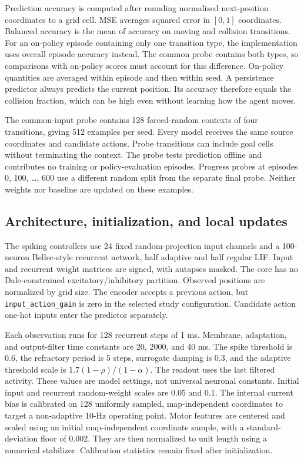 Prediction accuracy is computed after rounding normalized next-position coordinates to a grid cell. MSE averages squared error in $[0,1]$ coordinates. Balanced accuracy is the mean of accuracy on moving and collision transitions. For an on-policy episode containing only one transition type, the implementation uses overall episode accuracy instead. The common probe contains both types, so comparisons with on-policy scores must account for this difference. On-policy quantities are averaged within episode and then within seed. A persistence predictor always predicts the current position. Its accuracy therefore equals the collision fraction, which can be high even without learning how the agent moves.

The common-input probe contains 128 forced-random contexts of four transitions, giving 512 examples per seed. Every model receives the same source coordinates and candidate actions. Probe transitions can include goal cells without terminating the context. The probe tests prediction offline and contributes no training or policy-evaluation episodes. Progress probes at episodes 0, 100, \ldots, 600 use a different random split from the separate final probe. Neither weights nor baseline are updated on these examples.

\subsection{Architecture, initialization, and local updates}\label{app:architecture}
The spiking controllers use 24 fixed random-projection input channels and a 100-neuron Bellec-style recurrent network, half adaptive and half regular LIF. Input and recurrent weight matrices are signed, with autapses masked. The core has no Dale-constrained excitatory/inhibitory partition. Observed positions are normalized by grid size. The encoder accepts a previous action, but \texttt{input\_action\_gain} is zero in the selected study configuration. Candidate action one-hot inputs enter the predictor separately.

Each observation runs for 128 recurrent steps of 1 ms. Membrane, adaptation, and output-filter time constants are 20, 2000, and 40 ms. The spike threshold is 0.6, the refractory period is 5 steps, surrogate damping is 0.3, and the adaptive threshold scale is $1.7(1-\rho)/(1-\alpha)$. The readout uses the last filtered activity. These values are model settings, not universal neuronal constants. Initial input and recurrent random-weight scales are 0.05 and 0.1. The internal current bias is calibrated on 128 uniformly sampled, map-independent coordinates to target a non-adaptive 10-Hz operating point. Motor features are centered and scaled using an initial map-independent coordinate sample, with a standard-deviation floor of 0.002. They are then normalized to unit length using a numerical stabilizer. Calibration statistics remain fixed after initialization.

